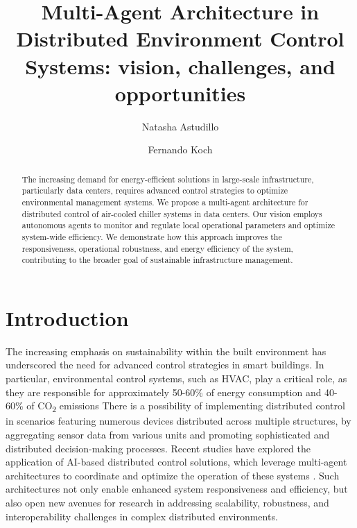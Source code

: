 \documentclass{svproc}
\begin{document}
\mainmatter 

\title{Multi-Agent Architecture in Distributed Environment Control Systems: vision, challenges, and opportunities}

\author{Natasha Astudillo  \and Fernando Koch}

\maketitle  
\begin{abstract}
The increasing demand for energy-efficient solutions in large-scale infrastructure, particularly data centers, requires advanced control strategies to optimize environmental management systems. We propose a multi-agent architecture for distributed control of air-cooled chiller systems in data centers. Our vision employs autonomous agents to monitor and regulate local operational parameters and optimize system-wide efficiency. We demonstrate how this approach improves the responsiveness, operational robustness, and energy efficiency of the system, contributing to the broader goal of sustainable infrastructure management. 
\end{abstract}

\section{Introduction}
\label{sec:introduction}


The increasing emphasis on sustainability within the built environment has underscored the need for advanced control strategies in smart buildings. In particular, environmental control systems, such as HVAC, play a critical role, as they are responsible for approximately 50-60\% of energy consumption and 40-60\% of CO\textsubscript{2} emissions \cite{saidur2009a, hidalgo2008a} There is a possibility of implementing distributed control in scenarios featuring numerous devices distributed across multiple structures, by aggregating sensor data from various units and promoting sophisticated and distributed decision-making processes. Recent studies have explored the application of AI-based distributed control solutions, which leverage multi-agent architectures to coordinate and optimize the operation of these systems \cite{fuentes-fernandez2009a}. Such architectures not only enable enhanced system responsiveness and efficiency, but also open new avenues for research in addressing scalability, robustness, and interoperability challenges in complex distributed environments.
\end{document}
